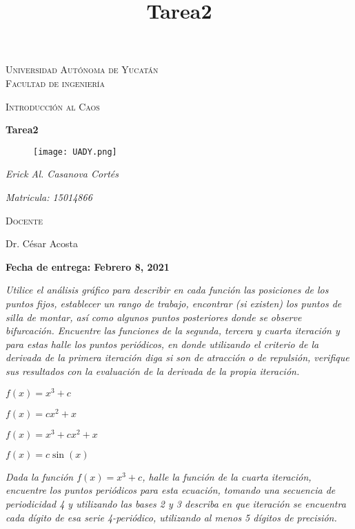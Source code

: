 \documentclass[11pt]{report}
\theoremstyle{plain}
\theoremstyle{definition}
\begin{document}
\begin{titlepage}
\title{Tarea2}


	\centering
	{\scshape\LARGE Universidad Autónoma de Yucatán  \\ Facultad de ingeniería\par}
	\vspace{1cm}
	{\scshape\Large Introducción al Caos\par}
	\vspace{1.5cm}
	{\huge\bfseries Tarea2\par}
	\vspace{0.7cm}
	{\begin{figure}[!h]
	\centering
    \texttt{[image: UADY.png]}
	\end{figure}}
	\vspace{0.7cm}
	{\Large\itshape Erick Al. Casanova Cortés\par}
	{\Large\itshape Matricula: 15014866\par}
	\vfill
	{\scshape\Large Docente\par
	Dr. César Acosta\par}
	\vfill
	{\Large{\bfseries Fecha de entrega: Febrero 8, 2021} }

	\vfill
	
\end{titlepage}


\textit{Utilice el análisis gráfico para describir en cada función las posiciones de los puntos fijos, establecer un rango de trabajo, encontrar (si existen) los puntos de silla de montar, así como algunos puntos posteriores donde se observe bifurcación. Encuentre las funciones de la segunda, tercera y cuarta iteración y para estas halle los puntos periódicos, en donde utilizando el criterio de la derivada de la primera iteración diga si son de atracción o de repulsión, verifique sus resultados con la evaluación de la derivada de la propia iteración.}

$f(x) = x^3 + c$

$f(x) = cx^2 + x$

$f(x) = x^3 + cx^2 + x$

$f(x) = c\sin(x)$

\textit{Dada la función $f (x) = x^3 + c$, halle la función de la cuarta iteración, encuentre los puntos
periódicos para esta ecuación, tomando una secuencia de periodicidad 4 y utilizando las bases 2 y 3 describa en que iteración se encuentra cada dígito de esa serie 4-periódico, utilizando al menos 5 dígitos de precisión.}
\end{document}
